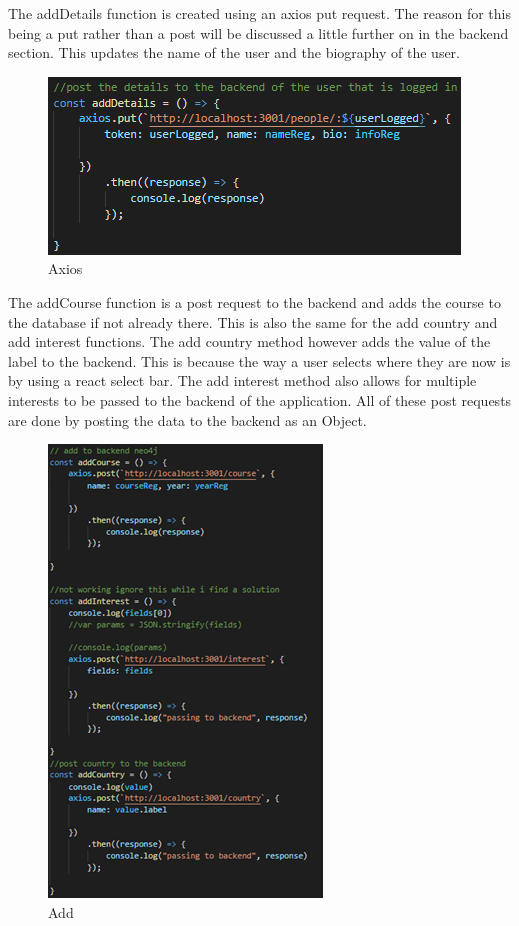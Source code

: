 The addDetails function is created using an axios put request. The reason for this being a put rather than a post will be discussed a little further on in the backend section. This updates the name of the user and the biography of the user. \\

\begin{figure}[H]
    \centering
    \includegraphics{img/register3.png}
    \caption{Axios} 
    \label{fig:my_label}
\end{figure}

The addCourse function is a post request to the backend and adds the course to the database if not already there. This is also the same for the add country and add interest functions. The add country method however adds the value of the label to the backend. This is because the way a user selects where they are now is by using a react select bar. The add interest method also allows for multiple interests to be passed to the backend of the application. All of these post requests are done by posting the data to the backend as an Object. 
\\
\begin{figure}[H]
    \centering
    \includegraphics{img/register4.png}
    \caption{Add} 
    \label{fig:my_label}
\end{figure}

